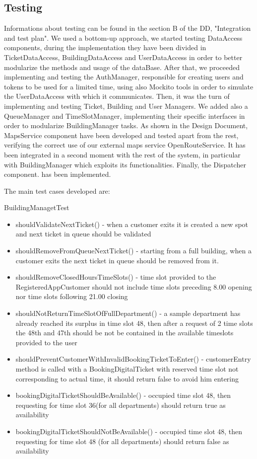 \renewcommand{\thesubsection}{\Alph{subsection}}
\subsection {Testing}
Informations about testing can be found in the section B of the DD, "Integration and test plan". We used a bottom-up approach, we started testing DataAccess components, during the implementation they have been divided in TicketDataAccess, BuildingDataAccess and UserDataAccess in order to better modularize the methods and usage of the dataBase. After that, we proceeded implementing and testing the AuthManager, responsible for creating users and tokens to be used for a limited time, using also Mockito tools in order to simulate the UserDataAccess with which it communicates. Then, it was the turn of implementing and testing Ticket, Building and User Managers. We added also a QueueManager and TimeSlotManager, implementing their specific interfaces in order to modularize BuildingManager tasks. As shown in the Design Document, MapsService component have been developed and tested apart from the rest, verifying the correct use of our external maps service OpenRouteService. It has been integrated in a second moment with the rest of the system, in particular with BuildingManager which exploits its functionalities. Finally, the Dispatcher component. has been implemented.


The main test cases developed are:

BuildingManagetTest
\begin {itemize}
	\item shouldValidateNextTicket() - when a customer exits it is created a new spot and next ticket in queue should be validated
	\item shouldRemoveFromQueueNextTicket() - starting from a full building, when a customer exits the next ticket in queue should be removed from it.
	\item shouldRemoveClosedHoursTimeSlots() - time slot provided to the RegisteredAppCustomer should not include time slots preceding 8.00 opening nor time slots following 21.00 closing
	\item shouldNotReturnTimeSlotOfFullDepartment() - a sample department has already reached its surplus in time slot 48, then after a request of 2 time slots the 48th and 47th should be not be contained in the available timeslots provided to the user
	\item shouldPreventCustomerWithInvalidBookingTicketToEnter() - customerEntry method is called with a BookingDigitalTicket with reserved time slot not corresponding to actual time, it should return false to avoid him entering
	\item bookingDigitalTicketShouldBeAvailable() - occupied time slot 48, then requesting for time slot 36(for all departments) should return true as availability
	\item bookingDigitalTicketShouldNotBeAvailable() - occupied time slot 48, then requesting for time slot 48 (for all departments) should return false as availability 
\end{itemize}

